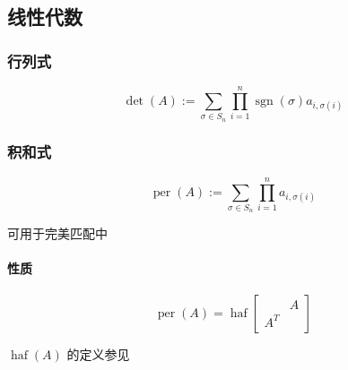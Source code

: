 \subsection{线性代数}

\subsubsection{行列式}

\[
    \operatorname{det}(A):=\sum_{\sigma\in S_n}\prod_{i=1}^n \operatorname{sgn}(\sigma) a_{i,\sigma(i)}
\]

\subsubsection{积和式}

\[
    \operatorname{per}(A):=\sum_{\sigma\in S_n}\prod_{i=1}^n a_{i,\sigma(i)}
\]

可用于完美匹配中

\paragraph{性质}

\[
    \operatorname{per}(A)=\operatorname{haf}\begin{bmatrix}
        & A\\
    A^T &
    \end{bmatrix}
\]

\(\operatorname{haf}(A)\) 的定义参见 
